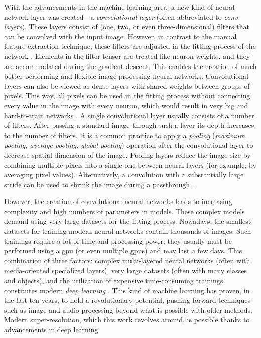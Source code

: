 With the advancements in the machine learning area, a new kind of neural network layer was created---a \textit{convolutional layer} (often abbreviated to \textit{conv layers}).
These layers consist of (one, two, or even three-dimensional) filters that can be convolved with the input image.
However, in  contrast to the manual feature extraction technique, these filters are adjusted in the fitting process of the network \cite{geron-2019-ml} .
Elements in the filter tensor are treated like neuron weights, and they are accommodated during the gradient descent.
This enables the creation of much better performing and flexible image processing neural networks.
Convolutional layers can also be viewed as dense layers with shared weights between groups of pixels.
This way, all pixels can be used in the fitting process without connecting every value in the image with every neuron, which would result in very big and hard-to-train networks \cite{goodfellow-2016-deeplearning}.
A single convolutional layer usually consists of a number of filters.
After passing a standard image through such a layer its depth increases to the number of filters.
It is a common practice to apply a \textit{pooling} (\textit{maximum pooling, average pooling, global pooling}) operation after the convolutional layer to decrease spatial dimension of the image.
Pooling layers reduce the image size by combining multiple pixels into a single one between neural layers (for example, by averaging pixel values).
Alternatively, a convolution with a substantially large stride can be used to shrink the image during a passthrough \cite{springenberg-2015-pooling}.

However, the creation of convolutional neural networks leads to increasing complexity and high numbers of parameters in models.
These complex models demand using very large datasets for the fitting process.
Nowadays, the smallest datasets for training modern neural networks contain thousands of images.
Such trainings require a lot of time and processing power; they usually must be performed using a \gls{gpu} (or even multiple \gls{gpu}s) and may last a few days.
This combination of three factors: complex multi-layered neural networks (often with media-oriented specialized layers), very large datasets (often with many classes and objects), and the utilization of expensive time-consuming trainings constitutes modern \textit{deep learning} \cite{lecun-2015-deeplearning}.
This kind of machine learning has proven, in the last ten years, to hold a revolutionary potential, pushing forward techniques such as image and audio processing beyond what is possible with older methods.
Modern super-resolution, which this work revolves around, is possible thanks to advancements in deep learning.

